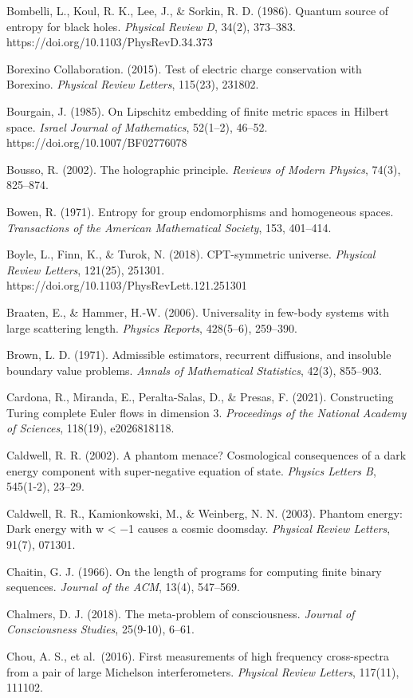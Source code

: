 \documentclass[
]{article}
\begin{document}
Bombelli, L., Koul, R. K., Lee, J., \& Sorkin, R. D. (1986). Quantum
source of entropy for black holes. \emph{Physical Review D}, 34(2),
373--383. https://doi.org/10.1103/PhysRevD.34.373

Borexino Collaboration. (2015). Test of electric charge conservation
with Borexino. \emph{Physical Review Letters}, 115(23), 231802.

Bourgain, J. (1985). On Lipschitz embedding of finite metric spaces in
Hilbert space. \emph{Israel Journal of Mathematics}, 52(1--2), 46--52.
https://doi.org/10.1007/BF02776078

Bousso, R. (2002). The holographic principle. \emph{Reviews of Modern
Physics}, 74(3), 825--874.

Bowen, R. (1971). Entropy for group endomorphisms and homogeneous
spaces. \emph{Transactions of the American Mathematical Society}, 153,
401--414.

Boyle, L., Finn, K., \& Turok, N. (2018). CPT-symmetric universe.
\emph{Physical Review Letters}, 121(25), 251301.
https://doi.org/10.1103/PhysRevLett.121.251301

Braaten, E., \& Hammer, H.-W. (2006). Universality in few-body systems
with large scattering length. \emph{Physics Reports}, 428(5--6),
259--390.

Brown, L. D. (1971). Admissible estimators, recurrent diffusions, and
insoluble boundary value problems. \emph{Annals of Mathematical
Statistics}, 42(3), 855--903.

Cardona, R., Miranda, E., Peralta-Salas, D., \& Presas, F. (2021).
Constructing Turing complete Euler flows in dimension 3.
\emph{Proceedings of the National Academy of Sciences}, 118(19),
e2026818118.

Caldwell, R. R. (2002). A phantom menace? Cosmological consequences of a
dark energy component with super-negative equation of state.
\emph{Physics Letters B}, 545(1-2), 23--29.

Caldwell, R. R., Kamionkowski, M., \& Weinberg, N. N. (2003). Phantom
energy: Dark energy with w \textless{} −1 causes a cosmic doomsday.
\emph{Physical Review Letters}, 91(7), 071301.

Chaitin, G. J. (1966). On the length of programs for computing finite
binary sequences. \emph{Journal of the ACM}, 13(4), 547--569.

Chalmers, D. J. (2018). The meta-problem of consciousness. \emph{Journal
of Consciousness Studies}, 25(9-10), 6--61.

Chou, A. S., et al.~(2016). First measurements of high frequency
cross-spectra from a pair of large Michelson interferometers.
\emph{Physical Review Letters}, 117(11), 111102.
\end{document}
